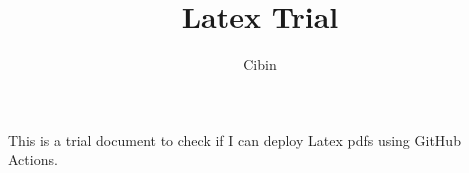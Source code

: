 \documentclass[10pt,a4paper]{article}
\title{Latex Trial}
\author{Cibin}
\begin{document}
	\maketitle
	
	This is a trial document to check if I can deploy Latex pdfs using GitHub Actions.
	
\end{document}
